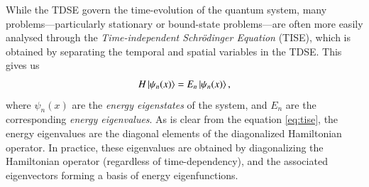 \documentclass{subfiles}
\begin{document}
While the TDSE govern the time-evolution of the quantum system, many problems—particularly stationary or bound-state problems—are often more easily analysed through the \emph{Time-independent Schrödinger Equation} (TISE), which is obtained by separating the temporal and spatial variables in the TDSE. This gives us
\begin{equation}
    H\ket{\psi_n(x)} = E_n\ket{\psi_n(x)}\label{eq:tise},
\end{equation}
where $\psi_n(x)$ are the \emph{energy eigenstates} of the system, and $E_n$ are the corresponding \emph{energy eigenvalues}. As is clear from the equation \eqref{eq:tise}, the energy eigenvalues are the diagonal elements of the diagonalized Hamiltonian operator. In practice, these eigenvalues are obtained by diagonalizing the Hamiltonian operator (regardless of time-dependency), and the associated eigenvectors forming a basis of energy eigenfunctions. \\
\end{document}
